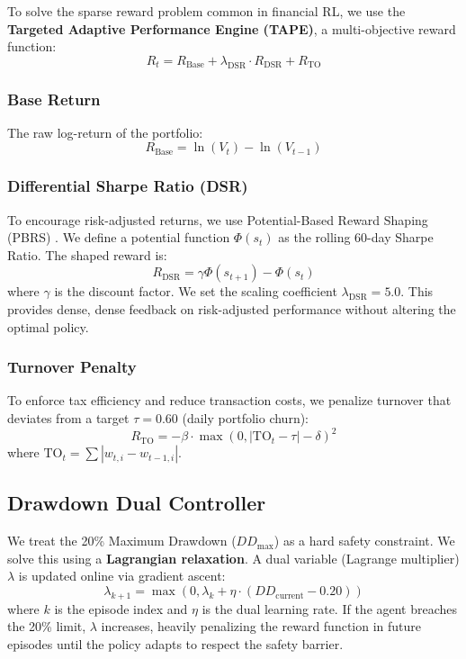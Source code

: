 To solve the sparse reward problem common in financial RL, we use the \textbf{Targeted Adaptive Performance Engine (TAPE)}, a multi-objective reward function:
\begin{equation}
    R_t = R_{\text{Base}} + \lambda_{\text{DSR}} \cdot R_{\text{DSR}} + R_{\text{TO}}
\end{equation}

\subsubsection{Base Return}
The raw log-return of the portfolio:
\begin{equation}
    R_{\text{Base}} = \ln(V_t) - \ln(V_{t-1})
\end{equation}

\subsubsection{Differential Sharpe Ratio (DSR)}
To encourage risk-adjusted returns, we use Potential-Based Reward Shaping (PBRS) \citep{ng1999policy}. We define a potential function $\Phi(s_t)$ as the rolling 60-day Sharpe Ratio. The shaped reward is:
\begin{equation}
    R_{\text{DSR}} = \gamma \Phi(s_{t+1}) - \Phi(s_t)
\end{equation}
where $\gamma$ is the discount factor. We set the scaling coefficient $\lambda_{\text{DSR}} = 5.0$. This provides dense, dense feedback on risk-adjusted performance without altering the optimal policy.

\subsubsection{Turnover Penalty}
To enforce tax efficiency and reduce transaction costs, we penalize turnover that deviates from a target $\tau = 0.60$ (daily portfolio churn):
\begin{equation}
    R_{\text{TO}} = - \beta \cdot \max(0, |\text{TO}_t - \tau| - \delta)^2
\end{equation}
where $\text{TO}_t = \sum |w_{t,i} - w_{t-1,i}|$.

\subsection{Drawdown Dual Controller}

We treat the 20\% Maximum Drawdown ($DD_{\text{max}}$) as a hard safety constraint. We solve this using a \textbf{Lagrangian relaxation}. A dual variable (Lagrange multiplier) $\lambda$ is updated online via gradient ascent:
\begin{equation}
    \lambda_{k+1} = \max(0, \lambda_k + \eta \cdot (DD_{\text{current}} - 0.20))
\end{equation}
where $k$ is the episode index and $\eta$ is the dual learning rate. If the agent breaches the 20\% limit, $\lambda$ increases, heavily penalizing the reward function in future episodes until the policy adapts to respect the safety barrier.
